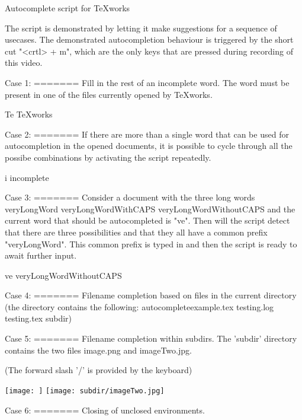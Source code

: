 Autocomplete script for TeXworks

The script is demonstrated by letting it make suggestions
for a sequence of usecases.
The demonstrated autocompletion behaviour is triggered by the
short cut "<crtl> + m", which are the only keys that are 
pressed during recording of this video.












Case 1:
=======
Fill in the rest of an incomplete word. The word must be 
present in one of the files currently opened by TeXworks.

Te
TeXworks












Case 2:
=======
If there are more than a single word that can be used for 
autocompletion in the opened documents, it is possible to 
cycle through all the possibe combinations by activating 
the script repeatedly.

i
incomplete










Case 3:
=======
Consider a document with the three long words
veryLongWord
veryLongWordWithCAPS
veryLongWordWithoutCAPS
and the current word that should be autocompleted is "ve".
Then will the script detect that there are three 
possibilities and that they all have a common prefix 
"veryLongWord". This common prefix is typed in and then the 
script is ready to await further input.

ve
veryLongWordWithoutCAPS





Case 4: 
=======
Filename completion based on files in the current directory
(the directory contains the following: 
autocompleteexample.tex
testing.log
testing.tex
subdir)











Case 5: 
=======
Filename completion within subdirs.
The 'subdir' directory contains the two files
image.png and imageTwo.jpg.

(The forward slash '/' is provided by the keyboard)

\texttt{[image: ]}
\texttt{[image: subdir/imageTwo.jpg]}









Case 6: 
=======
Closing of unclosed environments.


\begin{table}
\begin{tabular}{cc}

\end{tabular}
\end{table}










